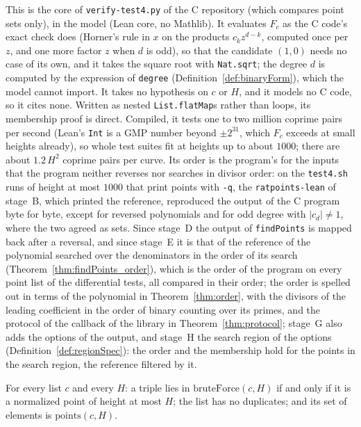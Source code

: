 This is the core of \verb|verify-test4.py| of the C repository (which compares point sets only), in
the model (Lean core, no Mathlib). It evaluates $F_c$ as the C code's exact check does (Horner's
rule in $x$ on the products $c_k z^{d-k}$, computed once per $z$, and one more factor $z$ when $d$
is odd), so that the candidate $(1, 0)$ needs no case of its own, and it takes the square root with
\verb|Nat.sqrt|; the degree $d$ is computed by the expression of \verb|degree|
(Definition~\ref{def:binaryForm}), which the model cannot import. It takes no hypothesis on $c$ or
$H$, and it models no C code, so it cites none. Written as nested \verb|List.flatMap|s rather than
loops, its membership proof is direct. Compiled, it tests one to two million coprime pairs per
second (Lean's \verb|Int| is a GMP number beyond $\pm 2^{31}$, which $F_c$ exceeds at small heights
already), so whole test suites fit at heights up to about $1000$; there are about $1.2\, H^2$
coprime pairs per curve. Its order is the program's for the inputs that the program neither reverses
nor searches in divisor order: on the \verb|test4.sh| runs of height at most $1000$ that print
points with \verb|-q|, the \verb|ratpoints-lean| of stage~B, which printed the reference, reproduced
the output of the C program byte for byte, except for reversed polynomials and for odd degree with
$|c_d| \ne 1$, where the two agreed as sets. Since stage~D the output of \verb|findPoints| is mapped
back after a reversal, and since stage~E it is that of the reference of the polynomial searched over
the denominators in the order of its search (Theorem~\ref{thm:findPoints_order}), which is the order
of the program on every point list of the differential tests, all compared in their order; the order
is spelled out in terms of the polynomial in Theorem~\ref{thm:order}, with the divisors of the
leading coefficient in the order of binary counting over its primes, and the protocol of the
callback of the library in Theorem~\ref{thm:protocol}; stage~G also adds the options of the output,
and stage~H the search region of the options (Definition~\ref{def:regionSpec}): the order and the
membership hold for the points in the search region, the reference filtered by it.

\begin{theorem}\label{thm:bruteForce}
  \leanok
  For every list $c$ and every $H$: a triple lies in
  $\mathrm{bruteForce}(c, H)$ if and only if it is a normalized point of height at most $H$;
  the list has no duplicates; and its set of elements is $\mathrm{points}(c, H)$.
\end{theorem}

